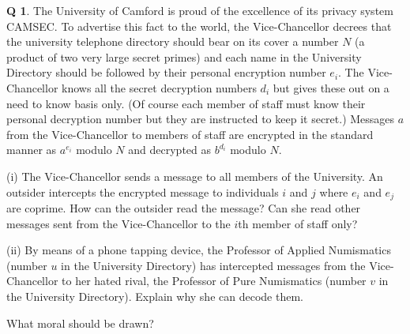 \documentclass[12pt,a4paper]{article}
\theoremstyle{plain}
\theoremstyle{definition}
\newtheorem{question}[theorem]{Q}
\begin{document}
    \begin{question}
        \label{C4.14} The University of Camford is proud of
        the excellence of its privacy system CAMSEC.
        To advertise this
        fact to the world, the Vice-Chancellor decrees that
        the university telephone directory should bear on its cover
        a number $N$ (a product of two very large secret primes)
        and each name in the University Directory should
        be followed by their personal encryption number $e_{i}$.
        The Vice-Chancellor knows all the secret decryption numbers
        $d_{i}$ but gives these out on a need to know basis only.
        (Of course each member of staff must know their
        personal decryption number but they are instructed to keep it secret.)
        Messages $a$ from the Vice-Chancellor
        to members of staff
        are encrypted in the standard manner
        as $a^{e_{i}}$ modulo $N$ and decrypted
        as $b^{d_{i}}$ modulo $N$.

        (i) The Vice-Chancellor sends a message to
        all members of the University.
        An outsider intercepts the encrypted message to
        individuals $i$ and $j$ where $e_{i}$ and $e_{j}$
        are coprime. How can the outsider read the message?
        Can she read other messages sent from the Vice-Chancellor
        to the $i$th member of staff only?

        (ii) By means of a phone tapping device,
        the Professor of Applied Numismatics
        (number $u$ in the University Directory)
        has intercepted messages from the
        Vice-Chancellor to her
        hated rival, the
        Professor of Pure Numismatics
        (number $v$ in the University Directory).
        Explain why she can decode them.

        What moral should be drawn?
    \end{question}
\end{document}
